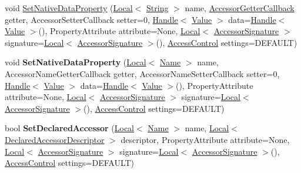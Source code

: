 \begin{DoxyCompactItemize}
\item 
void \hyperlink{classv8_1_1Template_ae186b9e472ed7604cc9693c7b9540909}{Set\+Native\+Data\+Property} (\hyperlink{classv8_1_1Local}{Local}$<$ \hyperlink{classv8_1_1String}{String} $>$ name, \hyperlink{namespacev8_a722613c87061708a4f1aa050d095f868}{Accessor\+Getter\+Callback} getter, Accessor\+Setter\+Callback setter=0, \hyperlink{classv8_1_1Handle}{Handle}$<$ \hyperlink{classv8_1_1Value}{Value} $>$ data=\hyperlink{classv8_1_1Handle}{Handle}$<$ \hyperlink{classv8_1_1Value}{Value} $>$(), Property\+Attribute attribute=None, \hyperlink{classv8_1_1Local}{Local}$<$ \hyperlink{classv8_1_1AccessorSignature}{Accessor\+Signature} $>$ signature=\hyperlink{classv8_1_1Local}{Local}$<$ \hyperlink{classv8_1_1AccessorSignature}{Accessor\+Signature} $>$(), \hyperlink{namespacev8_a31d8355cb043d7d2dda3f4a52760b64e}{Access\+Control} settings=D\+E\+F\+A\+U\+L\+T)
\item 
\hypertarget{classv8_1_1Template_a4204e1de1646c5102549afd67f36d16b}{}void {\bfseries Set\+Native\+Data\+Property} (\hyperlink{classv8_1_1Local}{Local}$<$ \hyperlink{classv8_1_1Name}{Name} $>$ name, Accessor\+Name\+Getter\+Callback getter, Accessor\+Name\+Setter\+Callback setter=0, \hyperlink{classv8_1_1Handle}{Handle}$<$ \hyperlink{classv8_1_1Value}{Value} $>$ data=\hyperlink{classv8_1_1Handle}{Handle}$<$ \hyperlink{classv8_1_1Value}{Value} $>$(), Property\+Attribute attribute=None, \hyperlink{classv8_1_1Local}{Local}$<$ \hyperlink{classv8_1_1AccessorSignature}{Accessor\+Signature} $>$ signature=\hyperlink{classv8_1_1Local}{Local}$<$ \hyperlink{classv8_1_1AccessorSignature}{Accessor\+Signature} $>$(), \hyperlink{namespacev8_a31d8355cb043d7d2dda3f4a52760b64e}{Access\+Control} settings=D\+E\+F\+A\+U\+L\+T)\label{classv8_1_1Template_a4204e1de1646c5102549afd67f36d16b}

\item 
\hypertarget{classv8_1_1Template_aa830a5e0071ecdc34f9cc9718b9aa760}{}bool {\bfseries Set\+Declared\+Accessor} (\hyperlink{classv8_1_1Local}{Local}$<$ \hyperlink{classv8_1_1Name}{Name} $>$ name, \hyperlink{classv8_1_1Local}{Local}$<$ \hyperlink{classv8_1_1DeclaredAccessorDescriptor}{Declared\+Accessor\+Descriptor} $>$ descriptor, Property\+Attribute attribute=None, \hyperlink{classv8_1_1Local}{Local}$<$ \hyperlink{classv8_1_1AccessorSignature}{Accessor\+Signature} $>$ signature=\hyperlink{classv8_1_1Local}{Local}$<$ \hyperlink{classv8_1_1AccessorSignature}{Accessor\+Signature} $>$(), \hyperlink{namespacev8_a31d8355cb043d7d2dda3f4a52760b64e}{Access\+Control} settings=D\+E\+F\+A\+U\+L\+T)\label{classv8_1_1Template_aa830a5e0071ecdc34f9cc9718b9aa760}

\end{DoxyCompactItemize}
